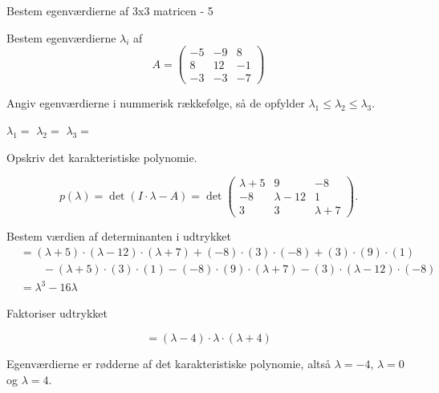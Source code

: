 \documentclass{article}
\begin{document}
\begin{exercise}{Bestem egenværdierne af 3x3 matricen - 5}

Bestem egenværdierne $\lambda_i$ af 
\[
A=\begin{pmatrix}
-5 & -9 & 8 \\
8 & 12 & -1 \\
-3 & -3 & -7
\end{pmatrix}
\]

Angiv egenværdierne i nummerisk rækkefølge, så de
opfylder $\lambda_1 \le \lambda_2 \le \lambda_3$.

$\lambda_1 = $
$\lambda_2 = $
$\lambda_3 = $

\hint
Opskriv det karakteristiske polynomie.

\hint
\[
p(\lambda)=\det\left(I \cdot \lambda - A \right)=\det\begin{pmatrix}
\lambda + 5 & 9 & -8 \\
-8 & \lambda - 12 & 1 \\
3 & 3 & \lambda + 7
\end{pmatrix}.
\]

\hint
Bestem værdien af determinanten i udtrykket
\begin{align*}
&=(\lambda+5) \cdot (\lambda-12) \cdot (\lambda+7)+(-8) \cdot (3) \cdot (-8)+(3) \cdot (9) \cdot (1) \\
&\qquad -(\lambda+5) \cdot (3) \cdot (1)-(-8) \cdot (9) \cdot (\lambda+7)-(3) \cdot (\lambda-12) \cdot (-8) \\
&=\lambda^3-16\lambda
\end{align*}

\hint
Faktoriser udtrykket

\hint
\[
=(\lambda-4) \cdot \lambda \cdot (\lambda+4)
\]

\hint
Egenværdierne er rødderne af det karakteristiske polynomie, 
altså
$\lambda=-4$, $\lambda=0$ og $\lambda=4$.

\end{exercise}
\end{document}
